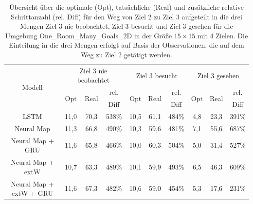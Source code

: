 \begin{table}
  \begin{tabular}{|c|c|c|c|c|c|c|c|c|c|}
    \hline
    \multirow{3}{*}{Modell} & \multicolumn{3}{|c|}{Ziel 3 nie beobachtet} & \multicolumn{3}{|c|}{Ziel 3 besucht} & \multicolumn{3}{|c|}{Ziel 3 gesehen} \\ \cline{2-10}
    & \multirow{2}{*}{Opt} & \multirow{2}{*}{Real} & rel. & \multirow{2}{*}{Opt} & \multirow{2}{*}{Real} & rel. & \multirow{2}{*}{Opt} & \multirow{2}{*}{Real} & rel. \\
    & & & Diff & & & Diff & & & Diff \\ \hline
    LSTM & 11,0 & 70,3 & 538\% & 10,5 & 61,1 & 484\% & 4,8 & 23,3 & 391\% \\ \hline
    Neural Map & 11,3 & 66,8 & 490\% & 10,3 & 59,6 & 481\% & 7,1 & 55,6 & 687\% \\ \hline
    Neural Map + GRU & 11,6 & 65,8 & 466\% & 10,0 & 60,3 & 504\% & 5,0 & 31,4 & 527\% \\ \hline
    Neural Map + extW & 10,7 & 63,3 & 489\% & 10,1 & 59,9 & 493\% & 6,5 & 46,3 & 609\% \\ \hline
    Neural Map + extW + GRU & 11,6 & 67,3 & 482\% & 10,6 & 59,0 & 454\% & 5,3 & 17,6 & 231\% \\ \hline
  \end{tabular}
  \caption{Übersicht über die optimale (Opt), tatsächliche (Real) und zusätzliche relative Schrittanzahl (rel. Diff) für den Weg von Ziel 2 zu Ziel 3 aufgeteilt in die drei Mengen \glqq Ziel 3 nie beobachtet\grqq{}, \glqq Ziel 3 besucht\grqq{} und \glqq Ziel 3 gesehen\grqq{} für die Umgebung \glqq One\_Room\_Many\_Goals\_2D\grqq{} in der Größe $15 \times 15$ mit 4 Zielen. Die Einteilung in die drei Mengen erfolgt auf Basis der Observationen, die auf dem Weg zu Ziel 2 getätigt werden.}
  \label{results15x15_2_to_3_per_M}
\end{table}


